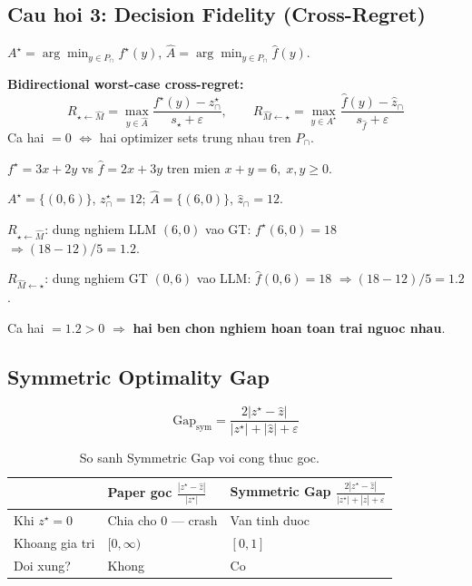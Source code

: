 \documentclass[11pt,a4paper]{article}
\begin{document}
\subsection{Cau hoi 3: Decision Fidelity (Cross-Regret)}

\begin{keyformula}
$A^\star = \arg\min_{y \in P_\cap} f^\star(y)$, \quad
$\widehat{A} = \arg\min_{y \in P_\cap} \widehat{f}(y)$.

\textbf{Bidirectional worst-case cross-regret:}
\[
R_{\star \leftarrow \widehat{M}} = \max_{y \in \widehat{A}}
\frac{f^\star(y) - z^\star_\cap}{s_\star + \varepsilon},
\qquad
R_{\widehat{M} \leftarrow \star} = \max_{y \in A^\star}
\frac{\widehat{f}(y) - \widehat{z}_\cap}{s_{\hat{f}} + \varepsilon}
\]
Ca hai $=0$ $\Leftrightarrow$ hai optimizer sets trung nhau tren $P_\cap$.
\end{keyformula}

\begin{example}
$f^\star=3x+2y$ vs $\hat{f}=2x+3y$ tren mien $x+y=6,\; x,y\geq0$.

$A^\star=\{(0,6)\}$, $z^\star_\cap=12$; $\widehat{A}=\{(6,0)\}$, $\widehat{z}_\cap=12$.

$R_{\star\leftarrow\widehat{M}}$: dung nghiem LLM $(6,0)$ vao GT: $f^\star(6,0)=18$
$\Rightarrow (18-12)/5=1.2$.

$R_{\widehat{M}\leftarrow\star}$: dung nghiem GT $(0,6)$ vao LLM: $\hat{f}(0,6)=18$
$\Rightarrow (18-12)/5=1.2$.

Ca hai $=1.2>0$ $\Rightarrow$ \textbf{hai ben chon nghiem hoan toan trai nguoc nhau}.
\end{example}

\subsection{Symmetric Optimality Gap}

\begin{keyformula}
\[
\mathrm{Gap}_{\mathrm{sym}} = \frac{2|z^\star - \hat{z}|}{|z^\star| + |\hat{z}| + \varepsilon}
\]
\end{keyformula}

\begin{table}[htbp]
\centering
\caption{So sanh Symmetric Gap voi cong thuc goc.}
\small
\begin{tabularx}{\textwidth}{L{3cm} Y Y}
\toprule
& \textbf{Paper goc} $\frac{|z^\star-\hat{z}|}{|z^\star|}$
& \textbf{Symmetric Gap} $\frac{2|z^\star-\hat{z}|}{|z^\star|+|\hat{z}|+\varepsilon}$ \\
\midrule
Khi $z^\star=0$ & Chia cho 0 --- crash & Van tinh duoc \\
Khoang gia tri & $[0,\infty)$ & $[0,1]$ \\
Doi xung? & Khong & Co \\
\bottomrule
\end{tabularx}
\end{table}
\end{document}
